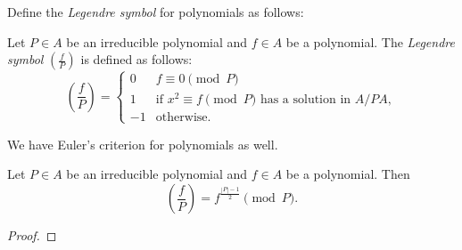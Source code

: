 Define the \emph{Legendre symbol} for polynomials as follows:
\begin{definition}
    Let $P \in A$ be an irreducible polynomial and $f \in A$ be a polynomial.
    The \emph{Legendre symbol} $\left(\frac{f}{P}\right)$ is defined as follows:
    \begin{equation}
        \left(\frac{f}{P}\right) = \begin{cases}
            0 & f \equiv 0 \pmod{P} \\
            1 & \text{if } x^2 \equiv f \pmod{P} \text{ has a solution in } A / P A, \\
            -1 & \text{otherwise.}
        \end{cases}
        \label{eqn:legendre-symbol-poly}
    \end{equation}
\end{definition}

We have Euler's criterion for polynomials as well.
\begin{theorem}
    \label{thm:euler-criterion-poly}
    Let $P \in A$ be an irreducible polynomial and $f \in A$ be a polynomial.
    Then
    \begin{equation}
        \left(\frac{f}{P}\right) = f^{\frac{|P| - 1}{2}} \pmod{P}.
        \label{eqn:euler-criterion-poly}
    \end{equation}
\end{theorem}
\begin{proof}
    
\end{proof}

